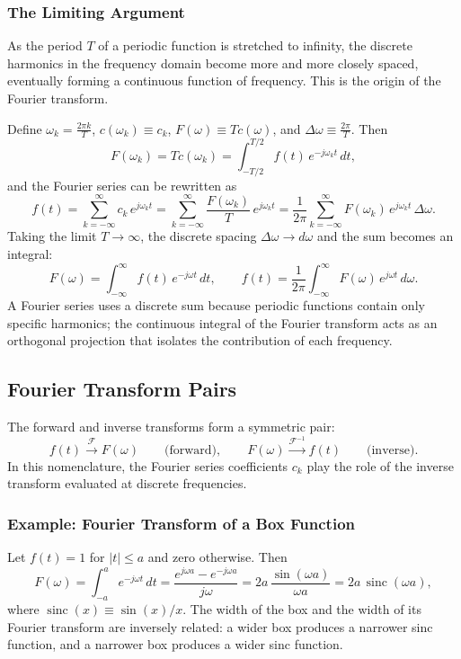 \documentclass{article}
\begin{document}
\subsubsection{The Limiting Argument}
As the period $T$ of a periodic function is stretched to infinity, the discrete harmonics in the frequency domain become more and more closely spaced, eventually forming a continuous function of frequency. This is the origin of the Fourier transform.

Define $\omega_k = \frac{2\pi k}{T}$, $c(\omega_k) \equiv c_k$, $F(\omega) \equiv T c(\omega)$, and $\Delta\omega \equiv \frac{2\pi}{T}$. Then
\[F(\omega_k) = T c(\omega_k) = \int_{-T/2}^{T/2} f(t)\,e^{-j\omega_k t}\,dt,\]
and the Fourier series can be rewritten as
\[f(t) = \sum_{k=-\infty}^{\infty} c_k\,e^{j\omega_k t} = \sum_{k=-\infty}^{\infty} \frac{F(\omega_k)}{T}\,e^{j\omega_k t} = \frac{1}{2\pi}\sum_{k=-\infty}^{\infty} F(\omega_k)\,e^{j\omega_k t}\,\Delta\omega.\]
Taking the limit $T \to \infty$, the discrete spacing $\Delta\omega \to d\omega$ and the sum becomes an integral:
\[F(\omega) = \int_{-\infty}^{\infty} f(t)\,e^{-j\omega t}\,dt, \qquad f(t) = \frac{1}{2\pi}\int_{-\infty}^{\infty} F(\omega)\,e^{j\omega t}\,d\omega.\]
A Fourier series uses a discrete sum because periodic functions contain only specific harmonics; the continuous integral of the Fourier transform acts as an orthogonal projection that isolates the contribution of each frequency.

\subsection{Fourier Transform Pairs}

The forward and inverse transforms form a symmetric pair:
\[f(t) \xrightarrow{\mathcal{F}} F(\omega) \qquad \text{(forward)}, \qquad F(\omega) \xrightarrow{\mathcal{F}^{-1}} f(t) \qquad \text{(inverse)}.\]
In this nomenclature, the Fourier series coefficients $c_k$ play the role of the inverse transform evaluated at discrete frequencies.

\subsubsection{Example: Fourier Transform of a Box Function}
Let $f(t) = 1$ for $|t| \leq a$ and zero otherwise. Then
\[F(\omega) = \int_{-a}^{a} e^{-j\omega t}\,dt = \frac{e^{j\omega a} - e^{-j\omega a}}{j\omega} = 2a\,\frac{\sin(\omega a)}{\omega a} = 2a\,\operatorname{sinc}(\omega a),\]
where $\operatorname{sinc}(x) \equiv \sin(x)/x$. The width of the box and the width of its Fourier transform are inversely related: a wider box produces a narrower sinc function, and a narrower box produces a wider sinc function.
\end{document}
